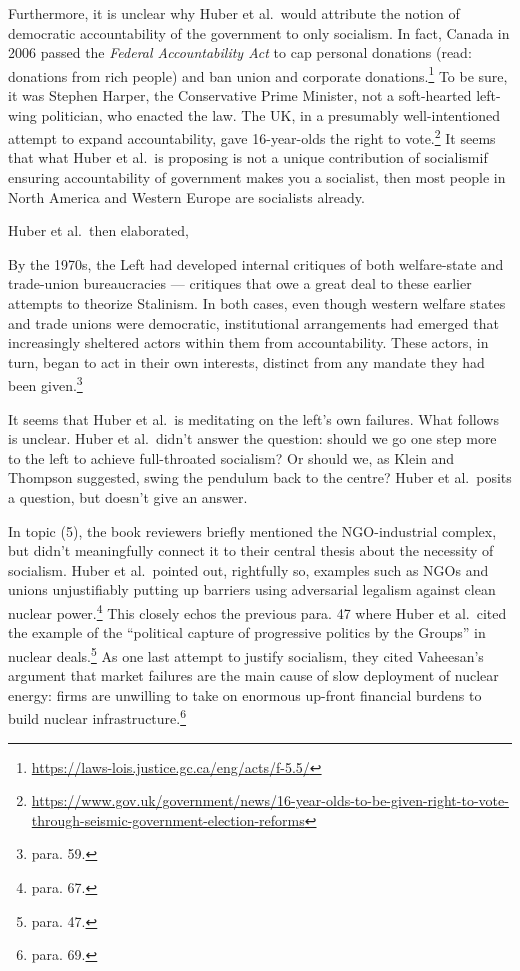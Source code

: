 \documentclass[12pt]{article}
\begin{document}
Furthermore, it is unclear why Huber et al.\ would attribute the notion of democratic accountability of the government to only socialism. In fact, Canada in 2006 passed the \textit{Federal Accountability Act} to cap personal donations (read: donations from rich people) and ban union and corporate donations.\footnote{\href{https://laws-lois.justice.gc.ca/eng/acts/f-5.5/}{https://laws-lois.justice.gc.ca/eng/acts/f-5.5/}} To be sure, it was Stephen Harper, the Conservative Prime Minister, not a soft-hearted left-wing politician, who enacted the law. The UK, in a presumably well-intentioned attempt to expand accountability, gave 16-year-olds the right to vote.\footnote{\href{https://www.gov.uk/government/news/16-year-olds-to-be-given-right-to-vote-through-seismic-government-election-reforms}{https://www.gov.uk/government/news/16-year-olds-to-be-given-right-to-vote-through-seismic-government-election-reforms}} It seems that what Huber et al.\ is proposing is not a unique contribution of socialism\textemdash{}if ensuring accountability of government makes you a socialist, then most people in North America and Western Europe are socialists already.

Huber et al.\ then elaborated,

	By the 1970s, the Left had developed internal critiques of both welfare-state and trade-union bureaucracies — critiques that owe a great deal to these earlier attempts to theorize Stalinism. In both cases, even though western welfare states and trade unions were democratic, institutional arrangements had emerged that increasingly sheltered actors within them from accountability. These actors, in turn, began to act in their own interests, distinct from any mandate they had been given.\footnote{para. 59.}

It seems that Huber et al.\ is meditating on the left's own failures. What follows is unclear. Huber et al.\ didn't answer the question: should we go one step more to the left to achieve full-throated socialism? Or should we, as Klein and Thompson suggested, swing the pendulum back to the centre? Huber et al.\ posits a question, but doesn't give an answer.

In topic (5), the book reviewers briefly mentioned the NGO-industrial complex, but didn't meaningfully connect it to their central thesis about the necessity of socialism. Huber et al.\ pointed out, rightfully so, examples such as NGOs and unions unjustifiably putting up barriers using adversarial legalism against clean nuclear power.\footnote{para. 67.} This closely echos the previous para. 47 where Huber et al.\ cited the example of the ``political capture of progressive politics by the Groups'' in nuclear deals.\footnote{para. 47.} As one last attempt to justify socialism, they cited Vaheesan's argument that market failures are the main cause of slow deployment of nuclear energy: firms are unwilling to take on enormous up-front financial burdens to build nuclear infrastructure.\footnote{para. 69.}
\end{document}
